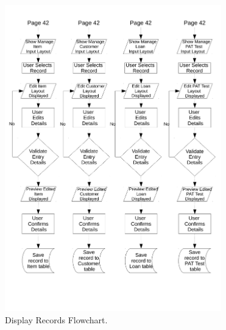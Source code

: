 \begin{figure}[H]
    \begin{center}
        \includegraphics[width=355px]{./Design/system_flowcharts/PDFs/manage_records_flowchart.pdf}
    \end{center}
    \caption{Display Records Flowchart.} \label{fig:print_function_result}
\end{figure}

